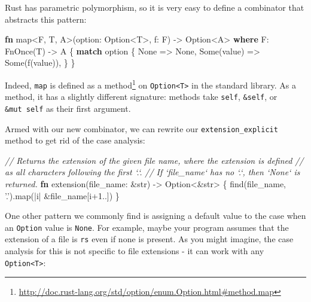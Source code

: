 \documentclass[a4paper,]{book}
\renewcommand*{\hypertarget}[3][\ar]{%
  \def\ar{#2}%
  \label{#1}%
  #3}
\newenvironment{Shaded}{\begin{snugshade}}{\end{snugshade}}
\newcommand{\KeywordTok}[1]{\textcolor[rgb]{0.13,0.29,0.53}{\textbf{{#1}}}}
\newcommand{\DataTypeTok}[1]{\textcolor[rgb]{0.13,0.29,0.53}{{#1}}}
\newcommand{\DecValTok}[1]{\textcolor[rgb]{0.00,0.00,0.81}{{#1}}}
\newcommand{\ConstantTok}[1]{\textcolor[rgb]{0.00,0.00,0.00}{{#1}}}
\newcommand{\CharTok}[1]{\textcolor[rgb]{0.31,0.60,0.02}{{#1}}}
\newcommand{\CommentTok}[1]{\textcolor[rgb]{0.56,0.35,0.01}{\textit{{#1}}}}
\newcommand{\BuiltInTok}[1]{{#1}}
\newcommand{\NormalTok}[1]{{#1}}
\renewcommand{\href}[2]{#2\footnote{\url{#1}}}
\begin{document}
Rust has parametric polymorphism, so it is very easy to define a
combinator that abstracts this pattern:

\protect\hypertarget{code-option-map}{}{}

\begin{Shaded}
\begin{Highlighting}[]
\KeywordTok{fn} \NormalTok{map<F, T, A>(option: }\DataTypeTok{Option}\NormalTok{<T>, f: F) -> }\DataTypeTok{Option}\NormalTok{<A> }\KeywordTok{where} \NormalTok{F: }\BuiltInTok{FnOnce}\NormalTok{(T) -> A \{}
    \KeywordTok{match} \NormalTok{option \{}
        \ConstantTok{None} \NormalTok{=> }\ConstantTok{None}\NormalTok{,}
        \ConstantTok{Some}\NormalTok{(value) => }\ConstantTok{Some}\NormalTok{(f(value)),}
    \NormalTok{\}}
\NormalTok{\}}
\end{Highlighting}
\end{Shaded}

Indeed, \texttt{map} is
\href{http://doc.rust-lang.org/std/option/enum.Option.html\#method.map}{defined
as a method} on \texttt{Option\textless{}T\textgreater{}} in the
standard library. As a method, it has a slightly different signature:
methods take \texttt{self}, \texttt{\&self}, or \texttt{\&mut\ self} as
their first argument.

Armed with our new combinator, we can rewrite our
\texttt{extension\_explicit} method to get rid of the case analysis:

\begin{Shaded}
\begin{Highlighting}[]
\CommentTok{// Returns the extension of the given file name, where the extension is defined}
\CommentTok{// as all characters following the first `.`.}
\CommentTok{// If `file_name` has no `.`, then `None` is returned.}
\KeywordTok{fn} \NormalTok{extension(file_name: &}\DataTypeTok{str}\NormalTok{) -> }\DataTypeTok{Option}\NormalTok{<&}\DataTypeTok{str}\NormalTok{> \{}
    \NormalTok{find(file_name, }\CharTok{'.'}\NormalTok{).map(|i| &file_name[i+}\DecValTok{1.}\NormalTok{.])}
\NormalTok{\}}
\end{Highlighting}
\end{Shaded}

One other pattern we commonly find is assigning a default value to the
case when an \texttt{Option} value is \texttt{None}. For example, maybe
your program assumes that the extension of a file is \texttt{rs} even if
none is present. As you might imagine, the case analysis for this is not
specific to file extensions - it can work with any
\texttt{Option\textless{}T\textgreater{}}:
\end{document}
